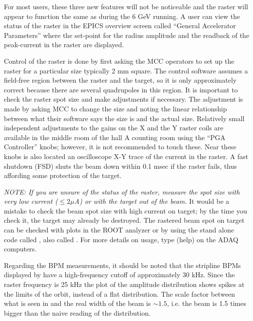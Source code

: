 {For most users, these three new features will not be
noticeable and the raster will appear to function
the same as during the 6 GeV running.
A user can view the 
status of the raster in the
EPICS overview screen called ``General Accelerator
Parameters'' where the set-point for the radius amplitude
and the readback of the peak-current in the raster are displayed.

Control of the raster is done by first asking the MCC
operators to set up the raster for a particular size
typically 2 mm square.
The control software assumes a field-free region between
the raster and the target, so it is only approximately
correct because there are several quadrupoles in this region.
It is important to check the raster spot size and
make adjustments if necessary.  The adjustment is made
by asking MCC to change the size and noting the 
linear relationship between what their software says
the size is and the actual size.
Relatively small independent adjustments to the 
gains on the X and the Y raster
coils are available in the middle room of the hall A
counting room using the ``PGA Controller'' knobs;
however, it is not recommended to touch these.
Near these knobs is also located an oscilloscope X-Y trace
of the current in the raster.  A fast shutdown (FSD) shuts
the beam down within 0.1 msec if the raster fails, thus
affording some protection of the target.

{\it NOTE:  If you are unsure of the status of the raster,
measure the spot size with very low current ($\le 2 \mu$A) or with
the target out of the beam.}  It would be a mistake
to check the beam spot size with high current on target; by
the time you check it, the target may already be destroyed.
The rastered beam spot on target can be checked with
plots in the ROOT analyzer or by 
using the stand alone code called ,
also called .
For more details on usage, type  (help)
on the ADAQ computers.

Regarding the BPM measurements, it should be noted that 
the stripline BPMs displayed by  have a high-frequency 
cutoff of approximately 30 kHz.  Since the raster frequency is 25 kHz
the plot of the amplitude distribution shows spikes at the 
limits of the orbit, instead of a flat distribution.  The scale
factor between what is seen in  and the real width of the beam
is $\sim 1.5$, i.e. the beam is 1.5 times bigger than the naive
reading of the  distribution.
}

